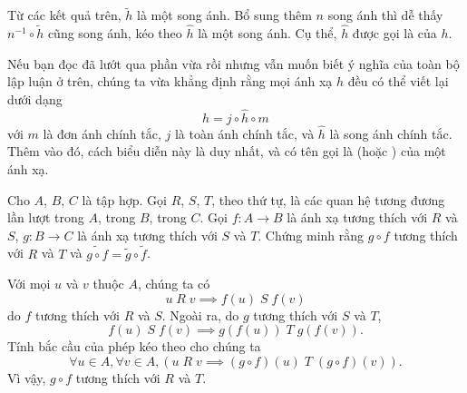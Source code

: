 Từ các kết quả trên, $\tilde{h}$ là một song ánh. Bổ sung thêm $n$ song ánh thì dễ thấy $n^{-1} \circ \tilde{h}$ cũng song ánh, kéo theo $\hat{h}$ là một song ánh. Cụ thể, $\hat{h}$ được gọi là  của $h$. 

Nếu bạn đọc đã lướt qua phần vừa rồi nhưng vẫn muốn biết ý nghĩa của toàn bộ lập luận ở trên, chúng ta vừa khẳng định rằng mọi ánh xạ $h$ đều có thể viết lại dưới dạng \begin{equation*}
   h = j \circ \hat{h} \circ m
\end{equation*}
với $m$ là đơn ánh chính tắc, $j$ là toàn ánh chính tắc, và $\hat{h}$ là song ánh chính tắc. Thêm vào đó, cách biểu diễn này là duy nhất, và có tên gọi là  (hoặc ) của một ánh xạ.

\exercise Cho $A$, $B$, $C$ là tập hợp. Gọi $R$, $S$, $T$, theo thứ tự, là các quan hệ tương đương lần lượt trong $A$, trong $B$, trong $C$. Gọi $f: A \to B$ là ánh xạ tương thích với $R$ và $S$, $g:B \to C$ là ánh xạ tương thích với $S$ và $T$. Chứng minh rằng $g \circ f$ tương thích với $R$ và $T$ và $\widetilde{g \circ f} = \tilde{g} \circ \tilde{f}$.

\solution

Với mọi $u$ và $v$ thuộc $A$, chúng ta có \begin{equation*}
   u\;R\;v \implies f(u)\;S\;f(v)
\end{equation*}
do $f$ tương thích với $R$ và $S$. Ngoài ra, do $g$ tương thích với $S$ và $T$, \begin{equation*}
   f(u)\;S\;f(v) \implies g(f(u))\;T\;g(f(v)).
\end{equation*}
Tính bắc cầu của phép kéo theo cho chúng ta \begin{equation*}
   \forall u \in A, \forall v \in A, \left(u\;R\;v \implies (g\circ f)(u)\;T\;(g\circ f)(v)\right).
\end{equation*}
Vì vậy, $g\circ f$ tương thích với $R$ và $T$.

